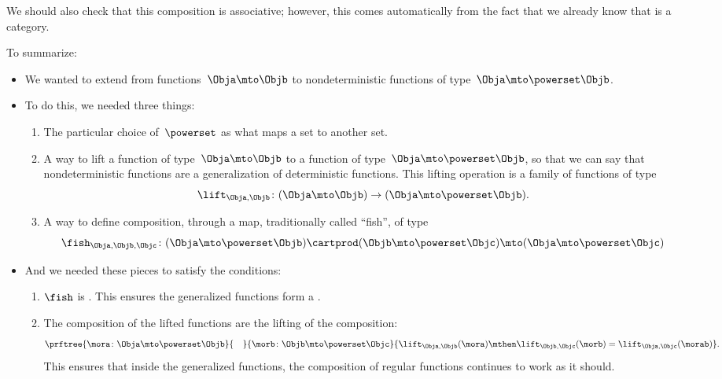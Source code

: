 We should also check that this composition is associative; however, this comes automatically from the fact that we already know that \Rel is a category.

To summarize:
\begin{itemize}
    \item We wanted to extend \Set from functions~$\Obja \mto \Objb$ to nondeterministic functions of type~$\Obja \mto \powerset\Objb$.
    \item To do this, we needed three things:
          \begin{enumerate}
              \item The particular choice of~$\powerset$ as what maps a set to another set.
              \item A way to lift a function of type~$\Obja \mto \Objb$ to a function of type~$\Obja \mto \powerset\Objb$, so that we can say that nondeterministic functions are a generalization of deterministic functions.
                    This lifting operation is a family of functions of type
                    \begin{equation}
                        \label{eq:monad-lift}
                        \lift_{\Obja, \Objb}\colon (\Obja \mto \Objb) \to (\Obja \mto \powerset\Objb).
                    \end{equation}
              \item A way to define composition, through a map, traditionally called ``fish'', of type
                    \begin{equation}
                        \label{eq:monad-fish}
                        \fish_{\Obja, \Objb, \Objc}\colon (\Obja \mto \powerset\Objb) \cartprod (\Objb \mto \powerset\Objc)
                        \mto (\Obja \mto \powerset \Objc)
                    \end{equation}
          \end{enumerate}
    \item And we needed these pieces to satisfy the conditions:
          \begin{enumerate}
              \item $\fish$ is .
                    This ensures the generalized functions form a .
              \item The composition of the lifted functions are the lifting of the composition:
                    \begin{equation}
                        \label{eq:monad-fish-associative}
                        \prftree{
                            \mora\colon \Obja \mto \powerset\Objb
                        }{
                            \quad
                        }{
                            \morb\colon \Objb \mto \powerset \Objc
                        }{
                            \lift_{\Obja,\Objb}(\mora)\mthen\lift_{\Objb,\Objc}(\morb) =  \lift_{\Obja,\Objc}(\morab)
                        }.
                    \end{equation}
                    This ensures that inside the generalized functions, the composition of regular functions continues to work as it should.
          \end{enumerate}
\end{itemize}

